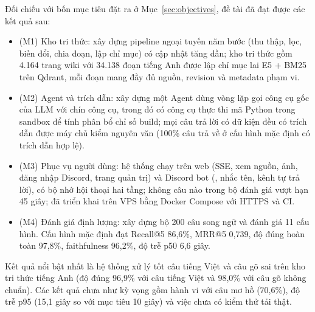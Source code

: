 \label{chap:conclusion}


Đối chiếu với bốn mục tiêu đặt ra ở Mục~\ref{sec:objectives}, đề tài đã đạt được các kết quả sau:
\begin{itemize}
    \item (M1) Kho tri thức: xây dựng pipeline ngoại tuyến năm bước (thu thập, lọc, biến đổi, chia đoạn, lập chỉ mục) có cập nhật tăng dần; kho tri thức gồm 4.164 trang wiki với 34.138 đoạn tiếng Anh được lập chỉ mục lai E5 + BM25 trên Qdrant, mỗi đoạn mang đầy đủ nguồn, revision và metadata phạm vi.
    \item (M2) Agent và trích dẫn: xây dựng một Agent dùng vòng lặp gọi công cụ gốc của LLM với chín công cụ, trong đó có công cụ thực thi mã Python trong sandbox để tính phân bổ chỉ số build; mọi câu trả lời có dữ kiện đều có trích dẫn được máy chủ kiểm nguyên văn (100\% câu trả về ở cấu hình mặc định có trích dẫn hợp lệ).
    \item (M3) Phục vụ người dùng: hệ thống chạy trên web (SSE, xem nguồn, ảnh, đăng nhập Discord, trang quản trị) và Discord bot (, nhắc tên, kênh tự trả lời), có bộ nhớ hội thoại hai tầng; không câu nào trong bộ đánh giá vượt hạn 45 giây; đã triển khai trên VPS bằng Docker Compose với HTTPS và CI.
    \item (M4) Đánh giá định lượng: xây dựng bộ 200 câu song ngữ và đánh giá 11 cấu hình. Cấu hình mặc định đạt Recall@5 86,6\%, MRR@5 0,739, độ đúng hoàn toàn 97,8\%, faithfulness 96,2\%, độ trễ p50 6,6 giây.
\end{itemize}
Kết quả nổi bật nhất là hệ thống xử lý tốt câu tiếng Việt và câu gõ sai trên kho tri thức tiếng Anh (độ đúng 96,9\% với câu tiếng Việt và 98,0\% với câu gõ không chuẩn). Các kết quả chưa như kỳ vọng gồm hành vi với câu mơ hồ (70,6\%), độ trễ p95 (15,1 giây so với mục tiêu 10 giây) và việc chưa có kiểm thử tải thật.


